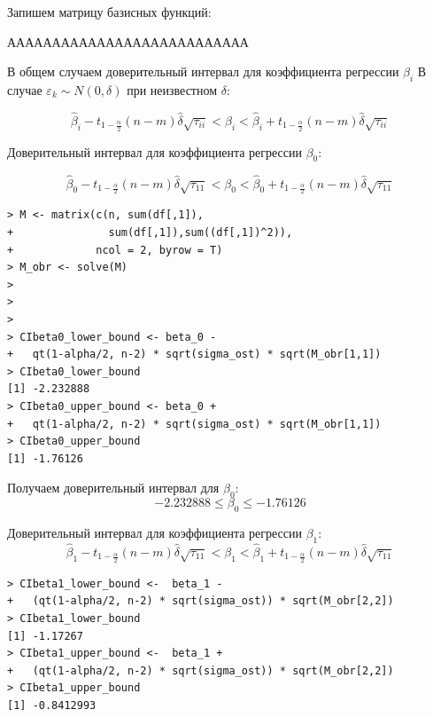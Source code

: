 \documentclass[14pt,a4paper]{scrartcl}
\begin{document}
Запишем матрицу базисных функций:


ААААААААААААААААААААААААААА


В общем случаем доверительный интервал для коэффициента регрессии $\beta_i$ В случае $\varepsilon_k \sim N(0,\delta)$ при неизвестном $\delta$:

\begin{equation*}
	\hat{\beta}_{i}-t_{1-\frac{\alpha}{2}}(n-m) \hat{\delta} \sqrt{\tau_{i i}}<\beta_{i}<\hat{\beta}_{i}+t_{1-\frac{\alpha}{2}}(n-m) \hat{\delta} \sqrt{\tau_{i i}}
\end{equation*}


Доверительный интервал для коэффициента регрессии $\beta_0$:


\begin{equation*}
	\hat{\beta}_{0}-t_{1-\frac{\alpha}{2}}(n-m) \hat{\delta} \sqrt{\tau_{11}}<\beta_{0}<\hat{\beta}_{0}+t_{1-\frac{\alpha}{2}}(n-m) \hat{\delta} \sqrt{\tau_{11}}
\end{equation*}

\begin{verbatim}
> M <- matrix(c(n, sum(df[,1]), 
+               sum(df[,1]),sum((df[,1])^2)), 
+             ncol = 2, byrow = T)
> M_obr <- solve(M)
> 
> 
> 
> CIbeta0_lower_bound <- beta_0 - 
+   qt(1-alpha/2, n-2) * sqrt(sigma_ost) * sqrt(M_obr[1,1])
> CIbeta0_lower_bound
[1] -2.232888
> CIbeta0_upper_bound <- beta_0 + 
+   qt(1-alpha/2, n-2) * sqrt(sigma_ost) * sqrt(M_obr[1,1])
> CIbeta0_upper_bound
[1] -1.76126
\end{verbatim}

Получаем доверительный интервал для $\beta_0$:
\begin{equation*}
	-2.232888 \leq \beta_0 \leq -1.76126
\end{equation*}

Доверительный интервал для коэффициента регрессии $\beta_1$:
\begin{equation}
	\hat{\beta}_{1}-t_{1-\frac{\alpha}{2}}(n-m) \hat{\delta} \sqrt{\tau_{11}}<\beta_{1}<\hat{\beta}_{1}+t_{1-\frac{\alpha}{2}}(n-m) \hat{\delta} \sqrt{\tau_{11}}
\end{equation}

\begin{verbatim}
> CIbeta1_lower_bound <-  beta_1 - 
+   (qt(1-alpha/2, n-2) * sqrt(sigma_ost)) * sqrt(M_obr[2,2])
> CIbeta1_lower_bound
[1] -1.17267
> CIbeta1_upper_bound <-  beta_1 + 
+   (qt(1-alpha/2, n-2) * sqrt(sigma_ost)) * sqrt(M_obr[2,2])
> CIbeta1_upper_bound
[1] -0.8412993
\end{verbatim}
\end{document}
